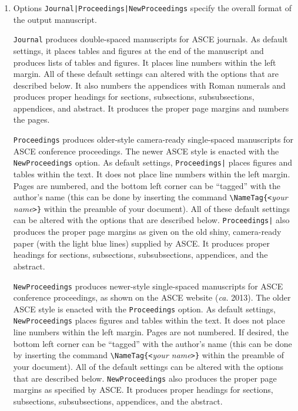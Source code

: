 \documentclass[Proceedings]{ascelike}
\begin{document}
\begin{enumerate}
\item
Options
\verb+Journal|+\verb+Proceedings|+\verb+NewProceedings+ specify the overall 
format of the output man\-u\-script.  
\par
\texttt{Journal} produces double-spaced manuscripts for ASCE journals.
As default settings, it places tables and figures at the end of the manuscript 
and produces lists of tables and figures.  
It places line numbers within the left margin.
All of these default settings can altered with the options that are 
described below.
It also numbers the appendices with Roman numerals and produces 
proper headings for
sections, subsections, subsubsections, appendices, and abstract.
It produces the proper page margins and numbers the pages.
%
\par
\texttt{Proceedings} produces older-style camera-ready single-spaced 
manu\-scripts for ASCE conference proceedings.  
The newer ASCE style is enacted with the \verb+NewProceedings+ option.
As default settings, 
\verb+Proceedings|+ places figures and tables within the text.  
It does not place line numbers within the left margin.
Pages are numbered, and the bottom left corner can be ``tagged'' with
the author's name (this can be done by inserting the command
\verb+\NameTag{<+\emph{your name}\verb+>}+ within the preamble of your
document).
All of these default settings can be altered with the options that are
described below.
\verb+Proceedings|+ also produces the proper page margins as
given on the old shiny, 
camera-ready paper (with the light blue lines) 
supplied by ASCE. 
It produces proper headings for
sections, subsections, subsubsections, appendices, and the abstract.
%
\par
\texttt{NewProceedings} produces newer-style single-spaced 
manu\-scripts for ASCE conference proceedings, as shown on the 
ASCE website (\emph{ca.} 2013).  
The older ASCE style is enacted with the \verb+Proceedings+ option.
As default settings,
\verb+NewProceedings+ places figures and tables within the text.
It does not place line numbers within the left margin.
Pages are not numbered.  
If desired, the bottom left corner can be ``tagged'' with
the author's name (this can be done by inserting the command
\verb+\NameTag{<+\emph{your name}\verb+>}+ within the preamble of your
document).
All of the default settings can be altered with the options that are
described below.
\verb+NewProceedings+ also produces the proper page margins as
specified by ASCE.
It produces proper headings for
sections, subsections, subsubsections, appendices, and the abstract.

\end{enumerate}
\end{document}
